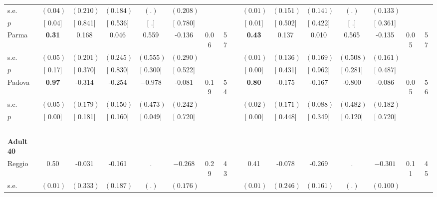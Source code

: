 \begin{longtable}{L{8em} c c c c c c c p{1em} c c c c c c c}
\quad \quad \quad \quad s.e.& $ (     0.04)$ & $ (    0.210)$ & $ (    0.184)$ & $ (        .)$ & $ (    0.208)$ & & & & $ (     0.01)$ & $ (    0.151)$ & $ (    0.141)$ & $ (        .)$ & $ (    0.133)$ & &  \\*
\quad \quad \quad \quad $ p$ & [     0.04] & [    0.841] & [    0.536] & [        .] & [    0.780] & & & & [     0.01] & [    0.502] & [    0.422] & [        .] & [    0.361] & &  \\[1em]
\quad \quad \quad Parma& \textbf{     0.31} &     0.168 &     0.046 &     0.559 &    -0.136 &      0.06 &        57 & & \textbf{     0.43} &     0.137 &     0.010 &     0.565 &    -0.135 &      0.05 &        57  \\*
\quad \quad \quad \quad s.e.& $ (     0.05)$ & $ (    0.201)$ & $ (    0.245)$ & $ (    0.555)$ & $ (    0.290)$ & & & & $ (     0.01)$ & $ (    0.136)$ & $ (    0.169)$ & $ (    0.508)$ & $ (    0.161)$ & &  \\*
\quad \quad \quad \quad $ p$ & [     0.17] & [    0.370] & [    0.830] & [    0.300] & [    0.522] & & & & [     0.00] & [    0.431] & [    0.962] & [    0.281] & [    0.487] & &  \\[1em]
\quad \quad \quad Padova& \textbf{     0.97} &    -0.314 &    -0.254 & $ \mathbf{   -0.978}$ &    -0.081 &      0.19 &        54 & & \textbf{     0.80} &    -0.175 &    -0.167 &    -0.800 &    -0.086 &      0.05 &        56  \\*
\quad \quad \quad \quad s.e.& $ (     0.05)$ & $ (    0.179)$ & $ (    0.150)$ & $ (    0.473)$ & $ (    0.242)$ & & & & $ (     0.02)$ & $ (    0.171)$ & $ (    0.088)$ & $ (    0.482)$ & $ (    0.182)$ & &  \\*
\quad \quad \quad \quad $ p$ & [     0.00] & [    0.181] & [    0.160] & [    0.049] & [    0.720] & & & & [     0.00] & [    0.448] & [    0.349] & [    0.120] & [    0.720] & &  \\[1em]
~\\[1em]
\quad \quad \textbf{Adult 40} & & & & & & & & & & & & & & & \\* 
\quad \quad \quad Reggio& 0.50 &    -0.031 &    -0.161 &         . & $ \mathbf{   -0.268}$ &      0.29 &        43 & & 0.41 &    -0.078 &    -0.269 &         . & $ \mathbf{   -0.301}$ &      0.11 &        45  \\*
\quad \quad \quad \quad s.e.& $ (     0.01)$ & $ (    0.333)$ & $ (    0.187)$ & $ (        .)$ & $ (    0.176)$ & & & & $ (     0.01)$ & $ (    0.246)$ & $ (    0.161)$ & $ (        .)$ & $ (    0.100)$ & &  \\*

\end{longtable}
